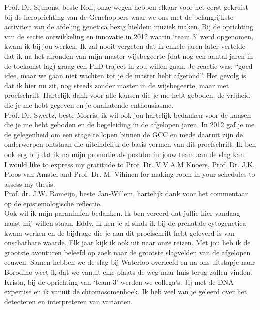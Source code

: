 \begin{appendices}
	\noindent Prof. Dr. Sijmons, beste Rolf, onze wegen hebben elkaar voor het eerst gekruist bij de heroprichting van de Genehoppers waar we ons met de belangrijkste activiteit van de afdeling genetica bezig hielden: muziek maken. Bij de oprichting van de sectie ontwikkeling en innovatie in 2012 waarin ‘team 3’ werd opgenomen, kwam ik bij jou werken. Ik zal nooit vergeten dat ik enkele jaren later vertelde dat ik na het afronden van mijn master wijsbegeerte (dat nog een aantal jaren in de toekomst lag) graag een PhD traject in zou willen gaan. Je reactie was: “goed idee, maar we gaan niet wachten tot je de master hebt afgerond”. Het gevolg is dat ik hier nu zit, nog steeds zonder master in de wijsbegeerte, maar met proefschrift. Hartelijk dank voor alle kansen die je me hebt geboden, de vrijheid die je me hebt gegeven en je onaflatende enthousiasme.\\ 
	
	\noindent Prof. Dr. Swertz, beste Morris, ik wil ook jou hartelijk bedanken voor de kansen die je me hebt geboden en de begeleiding in de afgelopen jaren. In 2012 gaf je me de gelegenheid om een stage te lopen binnen de GCC en mede daaruit zijn de onderwerpen ontstaan die uiteindelijk de basis vormen van dit proefschrift. Ik ben ook erg blij dat ik na mijn promotie als postdoc in jouw team aan de slag kan.\\ 
	
	\noindent I would like to express my gratitude to Prof. Dr. V.V.A.M Knoers, Prof. Dr. J.K. Ploos van Amstel and Prof. Dr. M. Vihinen for making room in your schedules to assess my thesis.\\ 
	
	\noindent Prof. dr. J.W. Romeijn, beste Jan-Willem, hartelijk dank voor het commentaar op de epistemologische reflectie.\\
	
	\noindent Ook wil ik mijn paranimfen bedanken. Ik ben vereerd dat jullie hier vandaag naast mij willen staan. Eddy, ik ken je al sinds ik bij de prenatale cytogenetica kwam werken en de bijdrage die je aan dit proefschrift hebt geleverd is van onschatbare waarde. Elk jaar kijk ik ook uit naar onze reizen. Met jou heb ik de grootste avonturen beleefd op zoek naar de grootste slagvelden van de afgelopen eeuwen. Samen hebben we de slag bij Waterloo overleefd en na ons uitstapje naar Borodino weet ik dat we vanuit elke plaats de weg naar huis terug zullen vinden. Krista, bij de oprichting van ‘team 3’ werden we collega’s. Jij met de DNA expertise en ik vanuit de chromosomenhoek. Ik heb veel van je geleerd over het detecteren en interpreteren van varianten.\\ 
	

\end{appendices}
